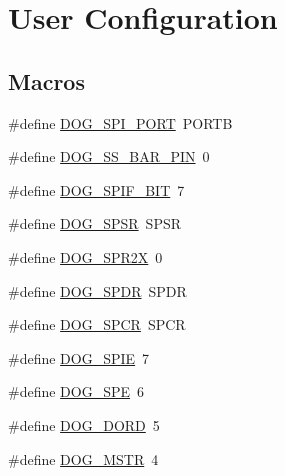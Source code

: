 \hypertarget{group___d_o_g_m128__user__configuration}{\section{User Configuration}
\label{group___d_o_g_m128__user__configuration}
}
\subsection*{Macros}
\begin{DoxyCompactItemize}
\item 
\#define \hyperlink{group___d_o_g_m128__user__configuration_gaf9e7124c755de651dd19889cd4304e37}{D\-O\-G\-\_\-\-S\-P\-I\-\_\-\-P\-O\-R\-T}~P\-O\-R\-T\-B
\item 
\#define \hyperlink{group___d_o_g_m128__user__configuration_ga7dc422a18a3abc45c6d2661e22239ed1}{D\-O\-G\-\_\-\-S\-S\-\_\-\-B\-A\-R\-\_\-\-P\-I\-N}~0
\item 
\#define \hyperlink{group___d_o_g_m128__user__configuration_ga7ee84e00e7608b2c0db5be4c98d2f372}{D\-O\-G\-\_\-\-S\-P\-I\-F\-\_\-\-B\-I\-T}~7
\item 
\#define \hyperlink{group___d_o_g_m128__user__configuration_ga276619987f64183ab549e7a3c590f2b0}{D\-O\-G\-\_\-\-S\-P\-S\-R}~S\-P\-S\-R
\item 
\#define \hyperlink{group___d_o_g_m128__user__configuration_ga08f0f6a4202a88867afab73e4e53e2e2}{D\-O\-G\-\_\-\-S\-P\-R2\-X}~0
\item 
\#define \hyperlink{group___d_o_g_m128__user__configuration_gaac040a40e5ddcb24b41b9b874c7e233d}{D\-O\-G\-\_\-\-S\-P\-D\-R}~S\-P\-D\-R
\item 
\#define \hyperlink{group___d_o_g_m128__user__configuration_ga62934fe8df286841d3c96eb0a0becea4}{D\-O\-G\-\_\-\-S\-P\-C\-R}~S\-P\-C\-R
\item 
\#define \hyperlink{group___d_o_g_m128__user__configuration_ga24deca3ddbd39da12413f13d47c31ab3}{D\-O\-G\-\_\-\-S\-P\-I\-E}~7
\item 
\#define \hyperlink{group___d_o_g_m128__user__configuration_ga97d060a772adc90a77ef22e1325b31d5}{D\-O\-G\-\_\-\-S\-P\-E}~6
\item 
\#define \hyperlink{group___d_o_g_m128__user__configuration_ga11db14770d84767d880859e22f576431}{D\-O\-G\-\_\-\-D\-O\-R\-D}~5
\item 
\#define \hyperlink{group___d_o_g_m128__user__configuration_gad4d7a46634e1ad445a83a65fe86f6ea3}{D\-O\-G\-\_\-\-M\-S\-T\-R}~4
\item 

\end{DoxyCompactItemize}
